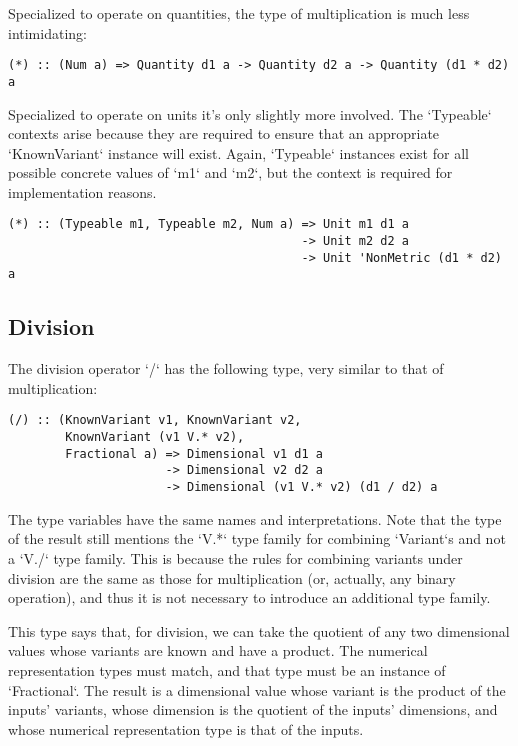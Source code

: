 \documentclass[11pt]{report}
\begin{document}
Specialized to operate on quantities, the type of multiplication is much less intimidating:

\begin{lstlisting}
(*) :: (Num a) => Quantity d1 a -> Quantity d2 a -> Quantity (d1 * d2) a
\end{lstlisting}

Specialized to operate on units it's only slightly more involved. The `Typeable` contexts arise because they are
required to ensure that an appropriate `KnownVariant` instance will exist. Again, `Typeable` instances exist for all
possible concrete values of `m1` and `m2`, but the context is required for implementation reasons.

\begin{lstlisting}
(*) :: (Typeable m1, Typeable m2, Num a) => Unit m1 d1 a
                                         -> Unit m2 d2 a
                                         -> Unit 'NonMetric (d1 * d2) a
\end{lstlisting}

\subsection{Division}

The division operator `/` has the following type, very similar to that of multiplication:

\begin{lstlisting}
(/) :: (KnownVariant v1, KnownVariant v2,
        KnownVariant (v1 V.* v2),
        Fractional a) => Dimensional v1 d1 a
                      -> Dimensional v2 d2 a
                      -> Dimensional (v1 V.* v2) (d1 / d2) a
\end{lstlisting}

The type variables have the same names and interpretations. Note that the type of the result still mentions the
`V.*` type family for combining `Variant`s and not a `V./` type family. This is because the rules for combining variants
under division are the same as those for multiplication (or, actually, any binary operation), and thus it is not necessary
to introduce an additional type family.

This type says that, for division, we can take the quotient of any two dimensional values whose variants are known and have a product.
The numerical representation types must match, and that type must be an instance of `Fractional`. The result is a dimensional value
whose variant is the product of the inputs' variants, whose dimension is the quotient of the inputs' dimensions, and whose numerical representation
type is that of the inputs.
\end{document}
